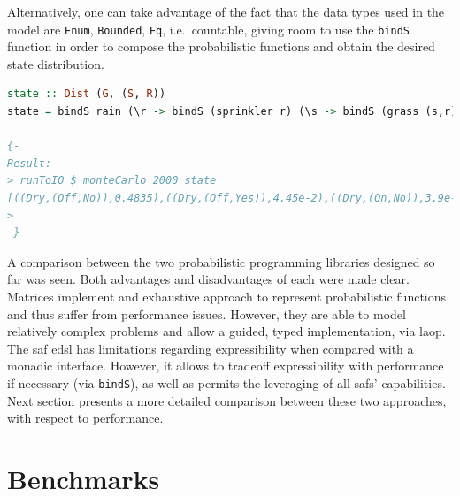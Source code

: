 \documentclass[
  oneside,
  11pt, a4paper,
  footinclude=true,
  headinclude=true,
  cleardoublepage=empty
]{scrbook}
\theoremstyle{definition}
\theoremstyle{definition}
\begin{document}
        Alternatively, one can take advantage of the fact that the data types used in the model are \texttt{Enum}, \texttt{Bounded}, \texttt{Eq}, i.e.\ countable, giving room to use the \texttt{bindS} function in order to compose the probabilistic functions and obtain the desired state distribution.
        
        \begin{lstlisting}[language=Haskell, caption={State distribution}, captionpos=b]
state :: Dist (G, (S, R))
state = bindS rain (\r -> bindS (sprinkler r) (\s -> bindS (grass (s,r)) (\g -> pure (g, (s,r)))))

{-
Result:
> runToIO $ monteCarlo 2000 state
[((Dry,(Off,No)),0.4835),((Dry,(Off,Yes)),4.45e-2),((Dry,(On,No)),3.9e-2),((Wet,(Off,Yes)),0.151),((Wet,(On,No)),0.28),((Wet,(On,Yes)),2.0e-3)]
>
-}
        \end{lstlisting}{}
        
        A comparison between the two probabilistic programming libraries designed so far was seen. Both advantages and disadvantages of each were made clear. Matrices implement and exhaustive approach to represent probabilistic functions and thus suffer from performance issues. However, they are able to model relatively complex problems and allow a guided, typed implementation, via \gls{laop}. The \gls{saf} \gls{edsl} has limitations regarding expressibility when compared with a monadic interface. However, it allows to tradeoff expressibility with performance if necessary (via \texttt{bindS}), as well as permits the leveraging of all \glspl{saf}' capabilities. Next section presents a more detailed comparison between these two approaches, with respect to performance.
        
        \section{Benchmarks}
        
\end{document}
